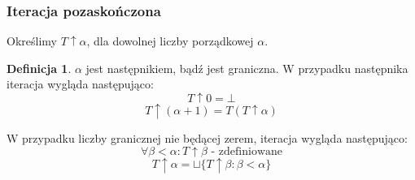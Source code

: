 \documentclass[10pt,a4paper]{article}
\theoremstyle{plain}
\theoremstyle{definition}
\newtheorem*{definition}{Definicja}
\begin{document}
\subsubsection{Iteracja pozaskończona}
Określimy $T \uparrow \alpha$, dla dowolnej liczby porządkowej $\alpha$.
\begin{definition}
$\alpha$ jest następnikiem, bądź jest graniczna. W przypadku następnika iteracja wygląda następująco:
\[ T \uparrow 0 = \bot \]
\[ T \uparrow (\alpha + 1) = T(T \uparrow \alpha) \]
\end{definition}
W przypadku liczby granicznej nie będącej zerem, iteracja wygląda następująco:
\[ \forall \beta < \alpha : T \uparrow \beta \text{ - zdefiniowane} \]
\[ T \uparrow \alpha = \sqcup \lbrace T \uparrow \beta : \beta < \alpha \rbrace \]
\end{document}
